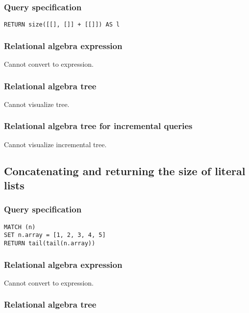 \subsubsection*{Query specification}

\begin{lstlisting}
RETURN size([[], []] + [[]]) AS l
\end{lstlisting}

\subsubsection*{Relational algebra expression}

Cannot convert to expression.

\subsubsection*{Relational algebra tree}

Cannot visualize tree.

\subsubsection*{Relational algebra tree for incremental queries}

Cannot visualize incremental tree.

\subsection{Concatenating and returning the size of literal lists}

\subsubsection*{Query specification}

\begin{lstlisting}
MATCH (n)
SET n.array = [1, 2, 3, 4, 5]
RETURN tail(tail(n.array))
\end{lstlisting}

\subsubsection*{Relational algebra expression}

Cannot convert to expression.

\subsubsection*{Relational algebra tree}

